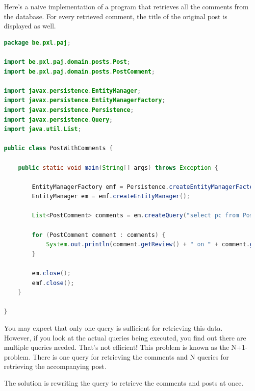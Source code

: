 Here's a naive implementation of a program that retrieves all the comments from the database.  For every retrieved comment, the title of the original post is displayed as well.

\begin{lstlisting}[frame=single,  language=java]
package be.pxl.paj;

import be.pxl.paj.domain.posts.Post;
import be.pxl.paj.domain.posts.PostComment;

import javax.persistence.EntityManager;
import javax.persistence.EntityManagerFactory;
import javax.persistence.Persistence;
import javax.persistence.Query;
import java.util.List;

public class PostWithComments {

	public static void main(String[] args) throws Exception {

		EntityManagerFactory emf = Persistence.createEntityManagerFactory("musicdb_pu");
		EntityManager em = emf.createEntityManager();

		List<PostComment> comments = em.createQuery("select pc from PostComment pc", PostComment.class).getResultList();
		
		for (PostComment comment : comments) {
			System.out.println(comment.getReview() + " on " + comment.getPost().getTitle());
		}

		em.close();
		emf.close();
	}

}
\end{lstlisting}

You may expect that only one query is sufficient for retrieving this data. However, if you look at the actual queries being executed, you find out there are multiple queries needed. That's not efficient! This problem is known as the N+1-problem.  There is one query for retrieving the comments and N queries for retrieving the accompanying post.

The solution is rewriting the query to retrieve the comments and posts at once. 

